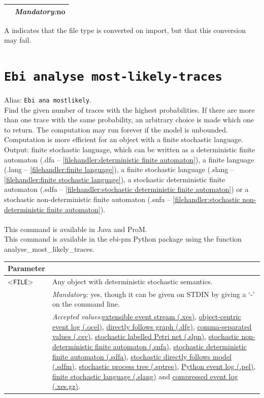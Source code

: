 {\begin{tabularx}{\linewidth}{lX}
&\textit{Mandatory:}\quad no\\
\bottomrule
\end{tabularx}
A \textdagger{} indicates that the file type is converted on import, but that this conversion may fail.
\clearpage\section{\texttt{Ebi analyse most-likely-traces}}
\label{command:Ebi analyse most-likely-traces}
Alias: \texttt{Ebi ana mostlikely}.\\
Find the given number of traces with the highest probabilities.
If there are more than one trace with the same probability, an arbitrary choice is made which one to return.
The computation may run forever if the model is unbounded.
Computation is more efficient for an object with a finite stochastic language.\\
\noindent Output: finite stochastic language, which can be written as a deterministic finite automaton (.dfa -- \cref{filehandler:deterministic finite automaton}), a finite language (.lang -- \cref{filehandler:finite language}), a finite stochastic language (.slang -- \cref{filehandler:finite stochastic language}), a stochastic deterministic finite automaton (.sdfa -- \cref{filehandler:stochastic deterministic finite automaton}) or a stochastic non-deterministic finite automaton (.snfa -- \cref{filehandler:stochastic non-deterministic finite automaton}).\\
\\This command is available in Java and ProM.
\\This command is available in the ebi-pm Python package using the function analyse\_most\_likely\_traces.
\begin{tabularx}{\linewidth}{lX}
\toprule
Parameter \\\midrule
<\texttt{FILE}>&Any object with deterministic stochastic semantics.\\
&\textit{Mandatory:} \quad yes, though it can be given on STDIN by giving a `-' on the command line.\\
&\textit{Accepted values:}\quad \hyperref[filehandler:extensible event stream]{extensible event stream (.xes)}, \hyperref[filehandler:object-centric event log]{object-centric event log (.ocel)}, \hyperref[filehandler:directly follows graph]{directly follows graph (.dfg)}, \hyperref[filehandler:comma-separated values]{comma-separated values (.csv)}, \hyperref[filehandler:stochastic labelled Petri net]{stochastic labelled Petri net (.slpn)}, \hyperref[filehandler:stochastic non-deterministic finite automaton]{stochastic non-deterministic finite automaton (.snfa)}, \hyperref[filehandler:stochastic deterministic finite automaton]{stochastic deterministic finite automaton (.sdfa)}, \hyperref[filehandler:stochastic directly follows model]{stochastic directly follows model (.sdfm)}, \hyperref[filehandler:stochastic process tree]{stochastic process tree (.sptree)}, \hyperref[filehandler:Python event log]{Python event log (.pel)}, \hyperref[filehandler:finite stochastic language]{finite stochastic language (.slang)} and \hyperref[filehandler:compressed event log]{compressed event log (.xes.gz)}.\\

\end{tabularx}}
